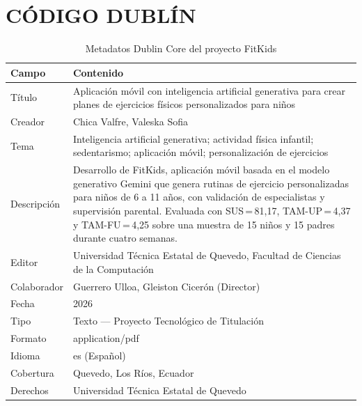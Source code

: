 \documentclass[12pt,a4paper,oneside]{report}
\begin{document}
	\chapter*{CÓDIGO DUBLÍN}
		\begin{table}[H]
			\centering
			\caption{Metadatos Dublin Core del proyecto FitKids}
			\begin{tabular}{|p{4.5cm}|p{9.5cm}|}
				\hline
				\textbf{Campo} & \textbf{Contenido}\\
				\hline
				Título      & Aplicación móvil con inteligencia artificial generativa para crear planes de ejercicios físicos personalizados para niños\\\hline
				Creador     & Chica Valfre, Valeska Sofia\\\hline
				Tema        & Inteligencia artificial generativa; actividad física infantil; sedentarismo; aplicación móvil; personalización de ejercicios\\\hline
				Descripción & Desarrollo de FitKids, aplicación móvil basada en el modelo generativo Gemini que genera rutinas de ejercicio personalizadas para niños de 6 a 11 años, con validación de especialistas y supervisión parental. Evaluada con SUS\,=\,81,17, TAM-UP\,=\,4,37 y TAM-FU\,=\,4,25 sobre una muestra de 15 niños y 15 padres durante cuatro semanas.\\\hline
				Editor      & Universidad Técnica Estatal de Quevedo, Facultad de Ciencias de la Computación\\\hline
				Colaborador & Guerrero Ulloa, Gleiston Cicerón (Director)\\\hline
				Fecha       & 2026\\\hline
				Tipo        & Texto — Proyecto Tecnológico de Titulación\\\hline
				Formato     & application/pdf\\\hline
				Idioma      & es (Español)\\\hline
				Cobertura   & Quevedo, Los Ríos, Ecuador\\\hline
				Derechos    & Universidad Técnica Estatal de Quevedo\\
				\hline
			\end{tabular}
		\end{table}
	\clearpage
	
	\tableofcontents\clearpage
	\listoftables\clearpage
	\listoffigures\clearpage
	
	\setcounter{page}{1}
	
	
	\clearpage
	
	
	
	
\end{document}

